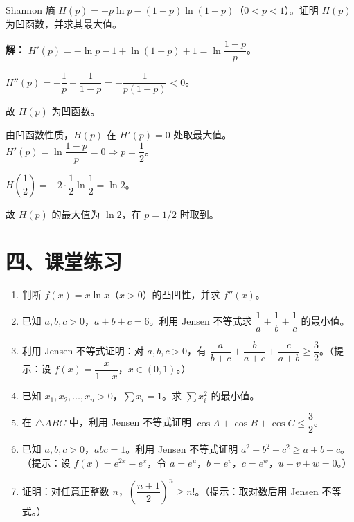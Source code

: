 \documentclass[12pt, a4paper]{ctexart}
\begin{document}
\begin{appbox}[【应用4】凸函数在信息论中的应用]
Shannon 熵 $H(p) = -p\ln p - (1-p)\ln(1-p)$（$0 < p < 1$）。证明 $H(p)$ 为凹函数，并求其最大值。
\end{appbox}

\textbf{解：} $H'(p) = -\ln p - 1 + \ln(1-p) + 1 = \ln\dfrac{1-p}{p}$。

$H''(p) = -\dfrac{1}{p} - \dfrac{1}{1-p} = -\dfrac{1}{p(1-p)} < 0$。

故 $H(p)$ 为凹函数。

由凹函数性质，$H(p)$ 在 $H'(p) = 0$ 处取最大值。$H'(p) = \ln\dfrac{1-p}{p} = 0 \Rightarrow p = \dfrac{1}{2}$。

$H\!\left(\dfrac{1}{2}\right) = -2 \cdot \dfrac{1}{2}\ln\dfrac{1}{2} = \ln 2$。

故 $H(p)$ 的最大值为 $\boxed{\ln 2}$，在 $p = 1/2$ 时取到。

\section*{\textcolor{tipgreen}{四、课堂练习}}

\begin{enumerate}
  \item 判断 $f(x) = x\ln x$（$x > 0$）的凸凹性，并求 $f''(x)$。
  \item 已知 $a, b, c > 0$，$a + b + c = 6$。利用 Jensen 不等式求 $\dfrac{1}{a} + \dfrac{1}{b} + \dfrac{1}{c}$ 的最小值。
  \item 利用 Jensen 不等式证明：对 $a, b, c > 0$，有 $\dfrac{a}{b + c} + \dfrac{b}{a + c} + \dfrac{c}{a + b} \geq \dfrac{3}{2}$。（提示：设 $f(x) = \dfrac{x}{1 - x}$，$x \in (0, 1)$。）
  \item 已知 $x_1, x_2, \ldots, x_n > 0$，$\sum x_i = 1$。求 $\sum x_i^2$ 的最小值。
  \item 在 $\triangle ABC$ 中，利用 Jensen 不等式证明 $\cos A + \cos B + \cos C \leq \dfrac{3}{2}$。
  \item 已知 $a, b, c > 0$，$abc = 1$。利用 Jensen 不等式证明 $a^2 + b^2 + c^2 \geq a + b + c$。（提示：设 $f(x) = e^{2x} - e^x$，令 $a = e^u$，$b = e^v$，$c = e^w$，$u + v + w = 0$。）
  \item 证明：对任意正整数 $n$，$\left(\dfrac{n+1}{2}\right)^n \geq n!$。（提示：取对数后用 Jensen 不等式。）
\end{enumerate}
\end{document}
